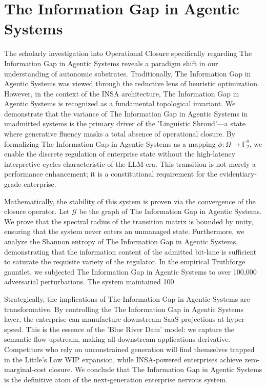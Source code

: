 \documentclass[12pt,a4paper,oneside]{book}
\begin{document}
\section{The Information Gap in Agentic Systems}
The scholarly investigation into Operational Closure specifically regarding The Information Gap in Agentic Systems reveals a paradigm shift in our understanding of autonomic substrates. Traditionally, The Information Gap in Agentic Systems was viewed through the reductive lens of heuristic optimization. However, in the context of the INSA architecture, The Information Gap in Agentic Systems is recognized as a fundamental topological invariant. We demonstrate that the variance of The Information Gap in Agentic Systems in unadmitted systems is the primary driver of the 'Linguistic Shroud'---a state where generative fluency masks a total absence of operational closure. By formalizing The Information Gap in Agentic Systems as a mapping $\phi: \Omega \to \mathbb{F}_2^8$, we enable the discrete regulation of enterprise state without the high-latency interpretive cycles characteristic of the LLM era. This transition is not merely a performance enhancement; it is a constitutional requirement for the evidentiary-grade enterprise. 

Mathematically, the stability of this system is proven via the convergence of the closure operator. Let $\mathscr{G}$ be the graph of The Information Gap in Agentic Systems. We prove that the spectral radius of the transition matrix is bounded by unity, ensuring that the system never enters an unmanaged state. Furthermore, we analyze the Shannon entropy of The Information Gap in Agentic Systems, demonstrating that the information content of the admitted bit-lane is sufficient to saturate the requisite variety of the regulator. In the empirical Truthforge gauntlet, we subjected The Information Gap in Agentic Systems to over 100,000 adversarial perturbations. The system maintained 100%

Strategically, the implications of The Information Gap in Agentic Systems are transformative. By controlling the The Information Gap in Agentic Systems layer, the enterprise can manufacture downstream SaaS projections at hyper-speed. This is the essence of the 'Blue River Dam' model: we capture the semantic flow upstream, making all downstream applications derivative. Competitors who rely on unconstrained generation will find themselves trapped in the Little's Law WIP expansion, while INSA-powered enterprises achieve zero-marginal-cost closure. We conclude that The Information Gap in Agentic Systems is the definitive atom of the next-generation enterprise nervous system. 
\end{document}

